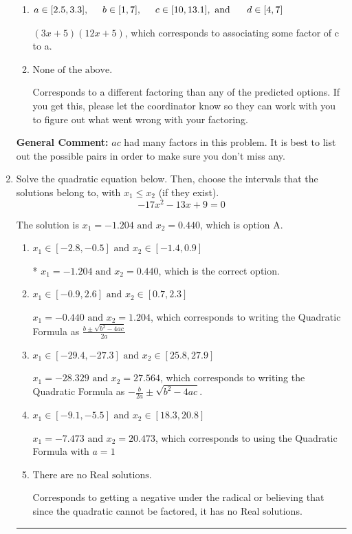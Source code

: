 \documentclass{extbook}[14pt]
\newcommand{\litem}[1]{\item #1

\rule{\textwidth}{0.4pt}}
\begin{document}
\begin{enumerate}
{\begin{enumerate}[label=\Alph*.]
* $(6x + 5)(6x + 5)$, which is the correct option.
\item \( a \in [2.5, 3.3], \hspace*{5mm} b \in [1, 7], \hspace*{5mm} c \in [10, 13.1], \text{ and } \hspace*{5mm} d \in [4, 7] \)

 $(3x + 5)(12x + 5)$, which corresponds to associating some factor of c to a.
\item \( \text{None of the above.} \)

 Corresponds to a different factoring than any of the predicted options. If you get this, please let the coordinator know so they can work with you to figure out what went wrong with your factoring.
\end{enumerate}

\textbf{General Comment:} $ac$ had many factors in this problem. It is best to list out the possible pairs in order to make sure you don't miss any.
}
\litem{
Solve the quadratic equation below. Then, choose the intervals that the solutions belong to, with $x_1 \leq x_2$ (if they exist).
\[ -17x^{2} -13 x + 9 = 0 \]

The solution is \( x_1 = -1.204 \text{ and } x_2 = 0.440 \), which is option A.\begin{enumerate}[label=\Alph*.]
\item \( x_1 \in [-2.8, -0.5] \text{ and } x_2 \in [-1.4, 0.9] \)

* $x_1 = -1.204 \text{ and } x_2 = 0.440$, which is the correct option.
\item \( x_1 \in [-0.9, 2.6] \text{ and } x_2 \in [0.7, 2.3] \)

 $x_1 = -0.440 \text{ and } x_2 = 1.204$, which corresponds to writing the Quadratic Formula as $\frac{b \pm \sqrt{b^2 - 4ac}}{2a}$
\item \( x_1 \in [-29.4, -27.3] \text{ and } x_2 \in [25.8, 27.9] \)

 $x_1 = -28.329 \text{ and } x_2 = 27.564$, which corresponds to writing the Quadratic Formula as $-\frac{b}{2a} \pm \sqrt{b^2 - 4ac}$.
\item \( x_1 \in [-9.1, -5.5] \text{ and } x_2 \in [18.3, 20.8] \)

 $x_1 = -7.473 \text{ and } x_2 = 20.473$, which corresponds to using the Quadratic Formula with $a=1$
\item \( \text{There are no Real solutions.} \)

Corresponds to getting a negative under the radical or believing that since the quadratic cannot be factored, it has no Real solutions.
\end{enumerate}

}
\end{enumerate}
\end{document}
